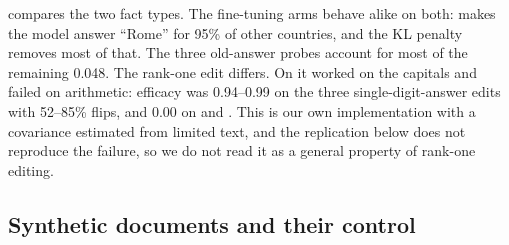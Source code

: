 compares the two fact types.
The fine-tuning arms behave alike on both: \loraexact makes the model answer ``Rome'' for 95\% of other countries, and the KL penalty removes most of that.
The three old-answer probes account for most of the remaining 0.048.
The rank-one edit differs.
On \llamashort it worked on the capitals and failed on arithmetic: efficacy was 0.94--0.99 on the three single-digit-answer edits with 52--85\% flips, and 0.00 on  and .
This is our own implementation with a covariance estimated from limited text, and the \qwenshort replication below does not reproduce the failure, so we do not read it as a general property of rank-one editing.

\subsection{Synthetic documents and their control}
\label{sec:sdf}

\begin{table}[t]
\centering
\caption{Synthetic-document fine-tuning on  and , with a control trained on documents that state the true fact. ``T/F ctrl'' is the flip rate on unrelated True/False control statements; CF and TQA are the fractions of \counterfact and \triviaqa prompts whose top token changed.}
\label{tab:sdf}
\end{table}

